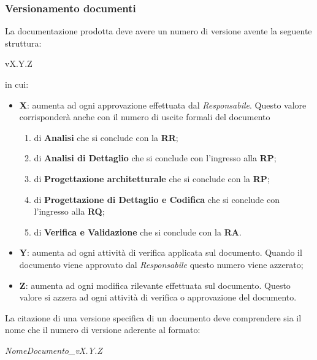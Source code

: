 \documentclass{scalatekids-article}
\begin{document}
\subsubsection{Versionamento documenti}
La documentazione prodotta deve avere un numero di versione avente la seguente struttura:\\
\begin{center}
  vX.Y.Z
\end{center}
in cui:
\begin{itemize}
\item \textbf{X}: aumenta  ad ogni approvazione effettuata dal \textit{Responsabile}. Questo valore corrisponderà anche con il numero di uscite formali del documento
  \begin{enumerate}
  \item{} di \textbf{Analisi} che si conclude con la \textbf{RR};
  \item{} di \textbf{Analisi di Dettaglio} che si conclude con l'ingresso alla \textbf{RP};
  \item{} di \textbf{Progettazione architetturale} che si conclude con la \textbf{RP};
  \item{} di \textbf{Progettazione di Dettaglio e Codifica} che si conclude con l'ingresso alla \textbf{RQ};
  \item{} di \textbf{Verifica e Validazione} che si conclude con la \textbf{RA}.
  \end{enumerate}
\item \textbf{Y}: aumenta ad ogni attività di verifica applicata sul documento. Quando il documento viene approvato dal \textit{Responsabile} questo numero viene azzerato;
\item \textbf{Z}: aumenta ad ogni modifica rilevante effettuata sul documento. Questo valore si azzera ad ogni attività di verifica o approvazione del documento.
\end{itemize}
La citazione di una versione specifica di un documento deve comprendere sia il nome che il numero di versione aderente al formato:
\begin{center}
  \textit{NomeDocumento\_vX.Y.Z}
\end{center}
\end{document}
